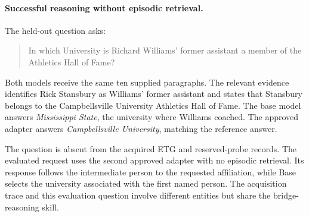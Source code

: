 \paragraph{Successful reasoning without episodic retrieval.}
The held-out question asks:
\begin{quote}\small
In which University is Richard Williams' former assistant a member of the Athletics Hall of Fame?
\end{quote}
Both models receive the same ten supplied paragraphs. The relevant evidence identifies Rick Stansbury as Williams' former assistant and states that Stansbury belongs to the Campbellsville University Athletics Hall of Fame. The base model answers \emph{Mississippi State}, the university where Williams coached. The approved adapter answers \emph{Campbellsville University}, matching the reference answer.

The question is absent from the acquired ETG and reserved-probe records. The evaluated request uses the second approved adapter with no episodic retrieval. Its response follows the intermediate person to the requested affiliation, while Base selects the university associated with the first named person. The acquisition trace and this evaluation question involve different entities but share the bridge-reasoning skill.
